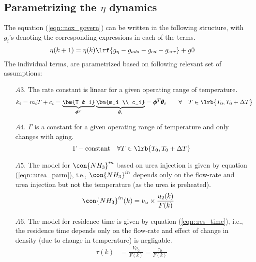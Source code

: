 \subsection{Parametrizing the $\eta$ dynamics}
The equation (\ref{eqn::nox_govern}) can be written in the following structure, with $g_i$'s denoting the corresponding expressions in each of the terms.
\begin{align}
        \eta(k+1) &= \eta(k) \lrf{ g_{\eta} - g_{ads} - g_{od} - g_{scr}} + g0
\end{align}
The individual terms, are parametrized based on following relevant set of assumptions:
\begin{itemize}
        \item[$A3.$] The rate constant is linear for a given operating range of temperature.
        \begin{align}
                k_i &= m_i T + c_i = \underbrace{\bm{T & 1}}_{\pmb \phi^T} \underbrace{\bm{m_i \\ c_i}}_{\pmb \theta_i}
                        = \pmb \phi^{T} \pmb \theta_i
                \qquad \forall \quad T \in \lrb{T_0, T_0 + \Delta T}
                \label{eqn::k_mdl}
        \end{align}
        \item[$A4.$] $\Gamma$ is a constant for a given operating range of temperature and only changes with aging.
        \begin{align}
                \Gamma - \text{constant} \quad \forall T \in \lrb{T_0, T_0 + \Delta T}
                \label{eqn::gamma_mdl}
        \end{align}
        \item[$A5.$] The model for $\con{NH_3}^{in}$ based on urea injection is given by equation (\ref{eqn::urea_parm}), i.e., $\con{NH_3}^{in}$ depends only on the flow-rate and urea injection but not the temperature (as the urea is preheated).
        \begin{align}
                \con{NH_3}^{in}(k) &= \nu_u \times \frac{u_2(k)}{F(k)}
                \label{eqn::urea_mdl}
        \end{align}
        \item[$A6.$] The model for residence time is given by equation (\ref{eqn::res_time}), i.e., the residence time depends only on the flow-rate and effect of change in density (due to change in temperature) is negligable.
        \begin{align}
                \tau(k) &= \frac{V \rho_0}{F(k)} = \frac{\tau_0}{F(k)}
                \label{eqn::residence_time_mdl}
        \end{align}
\end{itemize}

